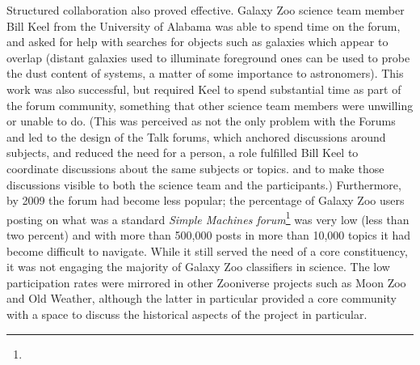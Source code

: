 \documentclass{sigchi}
\begin{document}
Structured collaboration also proved effective. Galaxy Zoo science team member Bill Keel from the University of Alabama was able to spend time on the forum, and asked for help with searches for objects such as galaxies which appear to overlap \cite{overlap} (distant galaxies used to illuminate foreground ones can be used to probe the dust content of systems, a matter of some importance to astronomers). This work was also successful, but required Keel to spend substantial time as part of the forum community, something that other science team members were unwilling or unable to do. (This was perceived as not the only problem with the Forums and led to the design of the Talk forums, which anchored discussions around subjects, and reduced the need for a person, a role fulfilled Bill Keel to coordinate discussions about the same subjects or topics. and to make those discussions visible to both the science team and the participants.) Furthermore, by 2009 the forum had become less popular; the percentage of Galaxy Zoo users posting on what was a standard \emph{Simple Machines forum}\footnote{} was very low (less than two percent) and with more than 500,000 posts in more than 10,000 topics it had become difficult to navigate. While it still served the need of a core constituency, it was not engaging the majority of Galaxy Zoo classifiers in science. 
The low participation rates were mirrored in other Zooniverse projects such as Moon Zoo and Old Weather, although the latter in particular provided a core community with a space to discuss the historical aspects of the project in particular.
\end{document}
